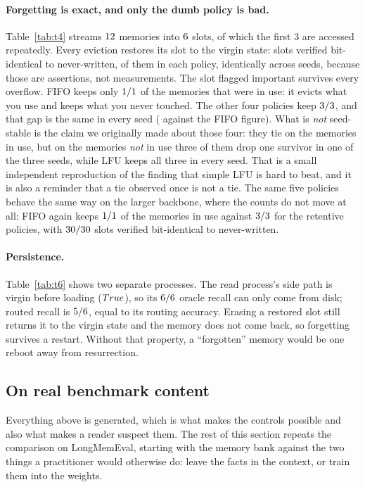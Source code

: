 \documentclass[11pt]{article}
\begin{document}
\paragraph{Forgetting is exact, and only the dumb policy is bad.}
Table~\ref{tab:t4} streams $12$ memories into $6$ slots, of which the first $3$
are accessed repeatedly. Every eviction restores its slot to the virgin state:
\tErasedTotal{} slots verified bit-identical to never-written, \tErased{} of them
in each policy, identically across \tSeedsCapacity{} seeds, because those are
assertions, not measurements. The slot flagged important survives every
overflow. FIFO keeps only $1/1$ of the memories that were in use: it evicts what
you use and keeps what you never touched. The other four policies keep $3/3{}$,
and that gap is the same in every seed (\tSmartHotRange{} against the FIFO figure). What
is \emph{not} seed-stable is the claim we originally made about those four: they tie on
the memories in use, but on the memories \emph{not} in use three of them drop one
survivor in one of the three seeds, while LFU keeps all three in every seed. That is a
small independent reproduction of the finding that simple LFU is hard to beat, and it is
also a reminder that a tie observed once is not a tie. The
same five policies behave the same way on the larger backbone, where the counts do not
move at all: FIFO again keeps $1/1$ of the memories in use against
$3/3$ for the retentive policies, with $30/30$ slots verified
bit-identical to never-written.

\paragraph{Persistence.} Table~\ref{tab:t6} shows two separate processes. The
read process's side path is virgin before loading ($True$), so its
$6/6$ oracle recall can only come from disk; routed recall is $5/6$,
equal to its routing accuracy. Erasing a restored slot still returns it to the
virgin state and the memory does not come back, so forgetting survives a restart. Without that property, a ``forgotten'' memory would be one reboot away from resurrection.

\subsection{On real benchmark content}

Everything above is generated, which is what makes the controls possible and also what makes
a reader suspect them. The rest of this section repeats the comparison on LongMemEval,
starting with the memory bank against the two things a practitioner would otherwise do:
leave the facts in the context, or train them into the weights.
\end{document}
